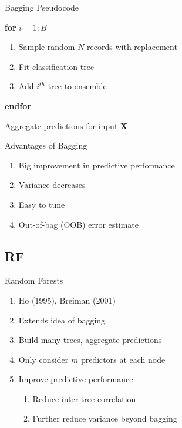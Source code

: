 \documentclass[pdf]{beamer}
\begin{document}
		
		\begin{frame}{Bagging Pseudocode}
			\begin{enumerate}[]
				{\selectfont
				\item{\textbf{for} $i = 1:B$}
					\begin{enumerate}[]
						\item{\hspace{3 mm} Sample random $N$ records with replacement}
						\item{\hspace{3 mm} Fit classification tree}
						\item{\hspace{3 mm} Add $i^{th}$ tree to ensemble}
					\end{enumerate}
				\item{\textbf{endfor}}
				\item{Aggregate predictions for input $\textbf{X}$}
				}
			\end{enumerate}
		\end{frame}
	
		
		\begin{frame}{Advantages of Bagging}
			\begin{enumerate}
				\item{Big improvement in predictive performance}
				\item{Variance decreases}
				\item{Easy to tune}
				\item{Out-of-bag (OOB) error estimate}
			\end{enumerate}
		\end{frame}

		
	
	\subsection{RF}
		\begin{frame}{Random Forests}
    			\begin{enumerate}
				\item{Ho (1995), Breiman (2001)}
				\item{Extends idea of bagging}
				\item{Build many trees, aggregate predictions}
				\item{Only consider $m$ predictors at each node}
				\item{Improve predictive performance}
					\begin{enumerate}[1]
						\item{Reduce inter-tree correlation}
						\item{Further reduce variance beyond bagging}
					\end{enumerate}
			\end{enumerate}
    		\end{frame}
\end{document}
